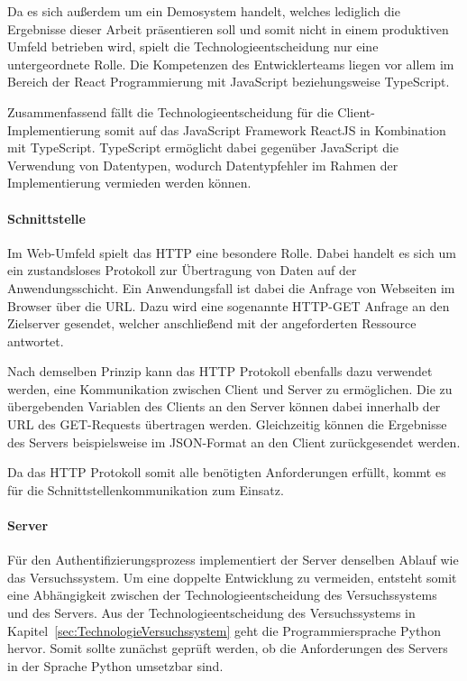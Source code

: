 Da es sich außerdem um ein Demosystem handelt, welches lediglich die Ergebnisse dieser Arbeit präsentieren soll und somit nicht in einem produktiven Umfeld betrieben wird, spielt die Technologieentscheidung nur eine untergeordnete Rolle.
Die Kompetenzen des Entwicklerteams liegen vor allem im Bereich der React Programmierung mit JavaScript beziehungsweise TypeScript.

Zusammenfassend fällt die Technologieentscheidung für die Client-Implementierung somit auf das JavaScript Framework ReactJS in Kombination mit TypeScript.
TypeScript ermöglicht dabei gegenüber JavaScript die Verwendung von Datentypen, wodurch Datentypfehler im Rahmen der Implementierung vermieden werden können.

\paragraph{Schnittstelle}
Im Web-Umfeld spielt das \ac{HTTP} eine besondere Rolle.
Dabei handelt es sich um ein zustandsloses Protokoll zur Übertragung von Daten auf der Anwendungsschicht.
Ein Anwendungsfall ist dabei die Anfrage von Webseiten im Browser über die URL.
Dazu wird eine sogenannte \ac{HTTP}-GET Anfrage an den Zielserver gesendet, welcher anschließend mit der angeforderten Ressource antwortet.

Nach demselben Prinzip kann das HTTP Protokoll ebenfalls dazu verwendet werden, eine Kommunikation zwischen Client und Server zu ermöglichen.
Die zu übergebenden Variablen des Clients an den Server können dabei innerhalb der URL des GET-Requests übertragen werden.
Gleichzeitig können die Ergebnisse des Servers beispielsweise im JSON-Format an den Client zurückgesendet werden.

Da das HTTP Protokoll somit alle benötigten Anforderungen erfüllt, kommt es für die Schnittstellenkommunikation zum Einsatz.

\paragraph{Server}
Für den Authentifizierungsprozess implementiert der Server denselben Ablauf wie das Versuchssystem.
Um eine doppelte Entwicklung zu vermeiden, entsteht somit eine Abhängigkeit zwischen der Technologieentscheidung des Versuchssystems und des Servers.
Aus der Technologieentscheidung des Versuchssystems in Kapitel~\ref{sec:TechnologieVersuchssystem} geht die Programmiersprache Python hervor.
Somit sollte zunächst geprüft werden, ob die Anforderungen des Servers in der Sprache Python umsetzbar sind.

